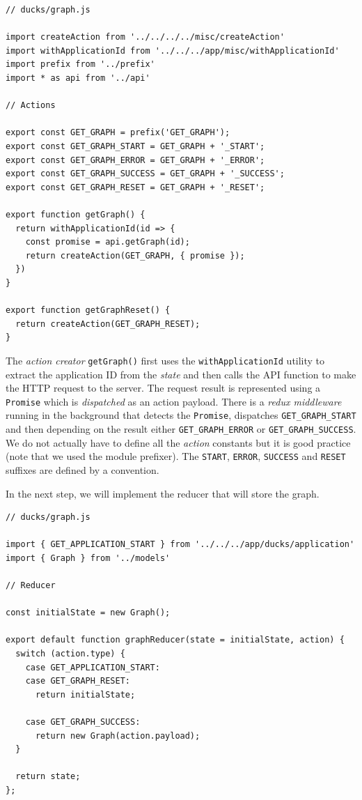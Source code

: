 \begin{verbatim}
// ducks/graph.js

import createAction from '../../../../misc/createAction'
import withApplicationId from '../../../app/misc/withApplicationId'
import prefix from '../prefix'
import * as api from '../api'

// Actions

export const GET_GRAPH = prefix('GET_GRAPH');
export const GET_GRAPH_START = GET_GRAPH + '_START';
export const GET_GRAPH_ERROR = GET_GRAPH + '_ERROR';
export const GET_GRAPH_SUCCESS = GET_GRAPH + '_SUCCESS';
export const GET_GRAPH_RESET = GET_GRAPH + '_RESET';

export function getGraph() {
  return withApplicationId(id => {
    const promise = api.getGraph(id);
    return createAction(GET_GRAPH, { promise });
  })
}

export function getGraphReset() {
  return createAction(GET_GRAPH_RESET);
}
\end{verbatim}

The \emph{action creator} \texttt{getGraph()} first uses the \texttt{withApplicationId} utility to extract the application ID from the \emph{state} and then calls the API function to make the HTTP request to the server. The request result is represented using a \texttt{Promise} which is \emph{dispatched} as an action payload. There is a \emph{redux middleware} running in the background that detects the \texttt{Promise}, dispatches \texttt{GET\_GRAPH\_START} and then depending on the result either \texttt{GET\_GRAPH\_ERROR} or \texttt{GET\_GRAPH\_SUCCESS}. We do not actually have to define all the \emph{action} constants but it is good practice (note that we used the module prefixer). The \texttt{START}, \texttt{ERROR}, \texttt{SUCCESS} and \texttt{RESET} suffixes are defined by a convention.

In the next step, we will implement the reducer that will store the graph.

\begin{verbatim}
// ducks/graph.js

import { GET_APPLICATION_START } from '../../../app/ducks/application'
import { Graph } from '../models'

// Reducer

const initialState = new Graph();

export default function graphReducer(state = initialState, action) {
  switch (action.type) {
    case GET_APPLICATION_START:
    case GET_GRAPH_RESET:
      return initialState;

    case GET_GRAPH_SUCCESS:
      return new Graph(action.payload);
  }

  return state;
};
\end{verbatim}

